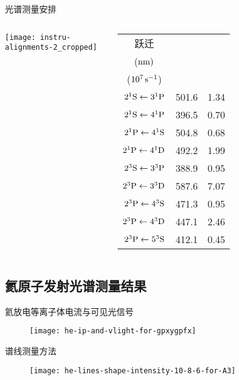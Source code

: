 \begin{CJK*}{UTF8}{kai}
\begin{frame}{光谱测量安排}
	\begin{columns}
	\begin{center}
		\texttt{[image: instru-alignments-2\_cropped]}
	\end{center}
\begin{tabular}{ccc}\toprule
跃迁 & \makecell[c]{$\lambda_{q\to p}$\\ (${\rm nm})$} & \makecell[c]{$A_{q\to p}^{\rm eff}$\\ ($10^7\,{\rm s}^{-1}$)}\\
\hline
$2^1{\rm S}\leftarrow3^1{\rm P}$ & 501.6 & 1.34 \\
$2^1{\rm S}\leftarrow4^1{\rm P}$ & 396.5 & 0.70 \\
$2^1{\rm P}\leftarrow4^1{\rm S}$ & 504.8 & 0.68 \\
$2^1{\rm P}\leftarrow4^1{\rm D}$ & 492.2 & 1.99 \\
$2^3{\rm S}\leftarrow3^3{\rm P}$ & 388.9 & 0.95 \\
$2^3{\rm P}\leftarrow3^3{\rm D}$ & 587.6 & 7.07 \\
$2^3{\rm P}\leftarrow4^3{\rm S}$ & 471.3 & 0.95 \\
$2^3{\rm P}\leftarrow4^3{\rm D}$ & 447.1 & 2.46 \\
$2^3{\rm P}\leftarrow5^3{\rm S}$ & 412.1 & 0.45 \\
\bottomrule
\end{tabular}
	\end{columns}
\end{frame}

\subsection{氦原子发射光谱测量结果}

\begin{frame}{氦放电等离子体电流与可见光信号}
	\centering
  \begin{figure}
      \texttt{[image: he-ip-and-vlight-for-gpxygpfx]}
  \end{figure}
\end{frame}

\begin{frame}{谱线测量方法}
	\centering
  \begin{figure}
      \texttt{[image: he-lines-shape-intensity-10-8-6-for-A3]}
  \end{figure}
\end{frame}


\end{CJK*}

